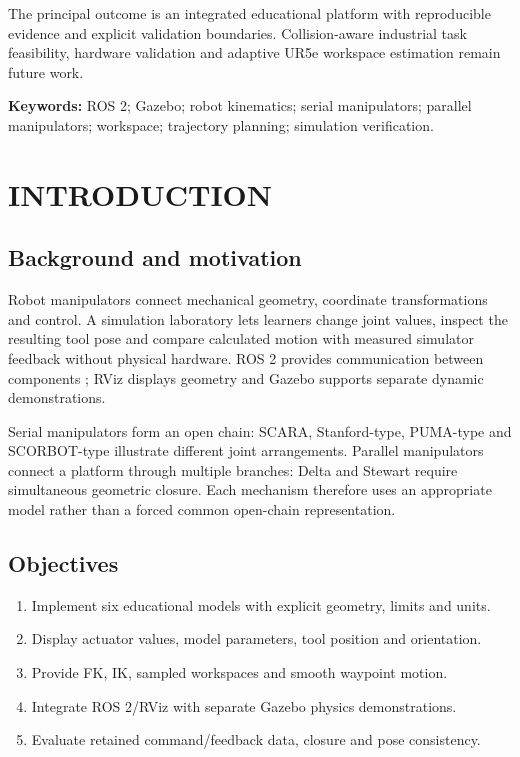\documentclass[11pt,a4paper,oneside]{report}
\begin{document}
The principal outcome is an integrated educational platform with reproducible evidence and explicit validation boundaries. Collision-aware industrial task feasibility, hardware validation and adaptive UR5e workspace estimation remain future work.

\textbf{Keywords:} ROS 2; Gazebo; robot kinematics; serial manipulators; parallel manipulators; workspace; trajectory planning; simulation verification.
\clearpage
\setcounter{tocdepth}{0}
\tableofcontents
\clearpage{}
\chapter{INTRODUCTION}
\section{Background and motivation}
Robot manipulators connect mechanical geometry, coordinate transformations and control. A simulation laboratory lets learners change joint values, inspect the resulting tool pose and compare calculated motion with measured simulator feedback without physical hardware. ROS 2 provides communication between components \cite{ros2}; RViz displays geometry and Gazebo supports separate dynamic demonstrations.

Serial manipulators form an open chain: SCARA, Stanford-type, PUMA-type and SCORBOT-type illustrate different joint arrangements. Parallel manipulators connect a platform through multiple branches: Delta and Stewart require simultaneous geometric closure. Each mechanism therefore uses an appropriate model rather than a forced common open-chain representation.

\section{Objectives}
\begin{enumerate}
\item Implement six educational models with explicit geometry, limits and units.
\item Display actuator values, model parameters, tool position and orientation.
\item Provide FK, IK, sampled workspaces and smooth waypoint motion.
\item Integrate ROS 2/RViz with separate Gazebo physics demonstrations.
\item Evaluate retained command/feedback data, closure and pose consistency.
\end{enumerate}
\end{document}
